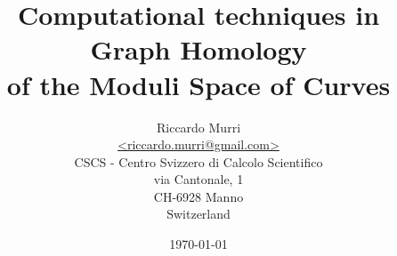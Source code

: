 

\title{%
  Computational techniques in Graph Homology \\
  of the Moduli Space of Curves
}
\date{\today}
\author{
  Riccardo Murri 
  \\ 
  \url{<riccardo.murri@gmail.com>} 
  \\
  CSCS - Centro Svizzero di Calcolo Scientifico \\
  via Cantonale, 1 \\
  CH-6928 Manno \\
  Switzerland
}

\maketitle

\setcounter{tocdepth}{2} %

\tableofcontents

